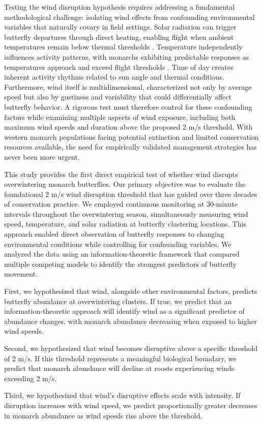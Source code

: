 Testing the wind disruption hypothesis requires addressing a fundamental methodological challenge: isolating wind effects from confounding environmental variables that naturally covary in field settings. Solar radiation can trigger butterfly departures through direct heating, enabling flight when ambient temperatures remain below thermal thresholds \citep{mastersMonarchButterflyDanaus1988}. Temperature independently influences activity patterns, with monarchs exhibiting predictable responses as temperatures approach and exceed flight thresholds \citep{barkerEffectPhotoperiodTemperature1976}. Time of day creates inherent activity rhythms related to sun angle and thermal conditions. Furthermore, wind itself is multidimensional, characterized not only by average speed but also by gustiness and variability \citep{nathanLongdistanceBiologicalTransport2005} that could differentially affect butterfly behavior. A rigorous test must therefore control for these confounding factors while examining multiple aspects of wind exposure, including both maximum wind speeds and duration above the proposed 2 m/s threshold. With western monarch populations facing potential extinction and limited conservation resources available, the need for empirically validated management strategies has never been more urgent.

This study provides the first direct empirical test of whether wind disrupts overwintering monarch butterflies. Our primary objective was to evaluate the foundational 2 m/s wind disruption threshold that has guided over three decades of conservation practice. We employed continuous monitoring at 30-minute intervals throughout the overwintering season, simultaneously measuring wind speed, temperature, and solar radiation at butterfly clustering locations. This approach enabled direct observation of butterfly responses to changing environmental conditions while controlling for confounding variables. We analyzed the data using an information-theoretic framework that compared multiple competing models to identify the strongest predictors of butterfly movement.

First, we hypothesized that wind, alongside other environmental factors, predicts butterfly abundance at overwintering clusters. If true, we predict that an information-theoretic approach will identify wind as a significant predictor of abundance changes, with monarch abundance decreasing when exposed to higher wind speeds.

Second, we hypothesized that wind becomes disruptive above a specific threshold of 2 m/s. If this threshold represents a meaningful biological boundary, we predict that monarch abundance will decline at roosts experiencing winds exceeding 2 m/s.

Third, we hypothesized that wind’s disruptive effects scale with intensity. If disruption increases with wind speed, we predict proportionally greater decreases in monarch abundance as wind speeds rise above the threshold.